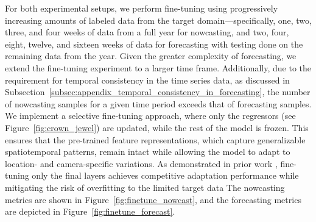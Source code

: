 For both experimental setups, we perform fine-tuning using progressively increasing amounts of labeled data from the target domain—specifically, one, two, three, and four weeks of data from a full year for nowcasting, and two, four, eight, twelve, and sixteen weeks of data for forecasting with testing done on the remaining data from the year. Given the greater complexity of forecasting, we extend the fine-tuning experiment to a larger time frame. Additionally, due to the requirement for temporal consistency in the time series data, as discussed in  Subsection~\ref{subsec:appendix_temporal_consistency_in_forecasting}, the number of nowcasting samples for a given time period exceeds that of forecasting samples. We implement a selective fine-tuning approach, where only the regressors (see Figure~\ref{fig:crown_jewel}) are updated, while the rest of the model is frozen. This ensures that the pre-trained feature representations, which capture generalizable spatiotemporal patterns, remain intact while allowing the model to adapt to location- and camera-specific variations. As demonstrated in prior work \cite{yuhao_transfer_learning, uses_freezing_for_tl, transfer_learning_strategies_comparison}, fine-tuning only the final layers achieves competitive adaptation performance while mitigating the risk of overfitting to the limited target data The nowcasting metrics are shown in Figure~\ref{fig:finetune_nowcast}, and the forecasting metrics are depicted in Figure~\ref{fig:finetune_forecast}.



